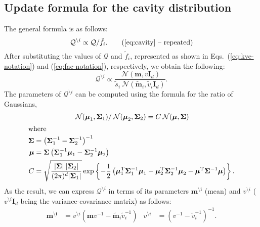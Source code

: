 \documentclass[11pt]{article}
\newcommand{\vek}[1]{\ensuremath{\mathbf{#1}}}
\newcommand{\kve}{\ensuremath{\mathcal{Q}}}
\newcommand{\norm}{\ensuremath{\:\mathcal{N}}}
\newcommand{\unity}{\ensuremath{\mathbf{I}}}
\begin{document}
\subsection*{Update formula for the cavity distribution}

The general formula is as follows:
\begin{equation}
	\kve^{\setminus i} \propto \kve / \tilde{f}_i.
	\tag{\ref{eq:cavity} -- repeated}
\end{equation}
After substituting the values of $\kve$ and $\tilde{f}_i$, represented as 
shown in Eqs.~(\ref{eq:kve-notation}) and (\ref{eq:fac-notation}), 
respectively, we obtain the following:
\begin{equation}
	\kve^{\setminus i} \propto \frac{\norm(\vek{m}, v\unity_{d})}
		{\tilde{s}_i\norm(\vek{\tilde{m}}_i, \tilde{v}_i\unity_{d})}.
\end{equation}
The parameters of $\kve^{\setminus i}$ can be computed using the formula 
for the ratio of Gaussians,
\begin{gather}
	\norm(\vek{\boldsymbol{\mu}}_1, \vek{\Sigma}_1)/\norm(\vek{\boldsymbol{\mu}}_2, \vek{\Sigma}_2) 
	= C\norm(\vek{\boldsymbol{\mu}}, \vek{\Sigma})\\
\intertext{where}
	\begin{aligned}
		\vek{\Sigma} &= \left(\vek{\Sigma}_1^{-1} 
			- \vek{\Sigma}_2^{-1}\right)^{-1} \\
		\vek{\boldsymbol{\mu}} &= \vek{\Sigma}\left(\vek{\Sigma}_1^{-1}\vek{\boldsymbol{\mu}}_1
			- \vek{\Sigma}_2^{-1}\vek{\boldsymbol{\mu}}_2\right) \\
		C &= \sqrt{\frac{|\vek{\Sigma}|\:|\vek{\Sigma}_2|}
									 {(2\pi)^d|\vek{\Sigma}_1|}}
				\exp\left\{-\frac{1}{2}\left(
						\vek{\boldsymbol{\mu}}_1^{\mathrm{T}}\vek{\Sigma}_1^{-1}\vek{\boldsymbol{\mu}}_1
						- \vek{\boldsymbol{\mu}}_2^{\mathrm{T}}\vek{\Sigma}_2^{-1}\vek{\boldsymbol{\mu}}_2 
						- \vek{\boldsymbol{\mu}}^{\mathrm{T}}\vek{\Sigma}^{-1}\vek{\boldsymbol{\mu}}
						\right)\right\}.
	\end{aligned}
\end{gather}
As the result, we can express $\kve^{\setminus i}$ in terms of its 
parameters $\vek{m^{\setminus i}}$ (mean) and $v^{\setminus i}$ 
($v^{\setminus i}\unity_{d}$ being the variance-covariance matrix) as follows:
\begin{align}
	\vek{m^{\setminus i}} &= v^{\setminus i}(\vek{m}v^{-1} 
	- \vek{\tilde{m}}_i\tilde{v}_i^{-1}) &%
	 v^{\setminus i} &= \left(v^{-1} - \tilde{v}_i^{-1}\right)^{-1}.
\end{align}
\end{document}
